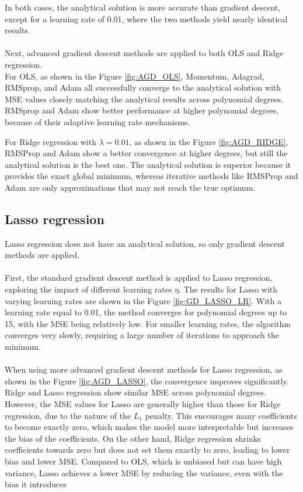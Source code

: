 \documentclass[
 reprint,            %
 amsmath,amssymb,
 aps,
]{revtex4-2}
\begin{document}
In both cases, the analytical solution is more accurate than gradient descent, except for a learning rate of 0.01, where the two methods yield nearly identical results.\\\\
Next, advanced gradient descent methods are applied to both OLS and Ridge regression.\\
For OLS, as shown in the Figure \ref{fig:AGD_OLS}, Momentum, Adagrad, RMSprop, and Adam all successfully converge to the analytical solution with MSE values closely matching the analytical results across polynomial degrees.
RMSprop and Adam show better performance at higher polynomial degrees, because of their adaptive learning rate mechanisms.



For Ridge regression with $\lambda = 0.01$, as shown in the Figure \ref{fig:AGD_RIDGE}, RMSProp and Adam show a better convergence at higher degrees, but still the analytical solution is the best one. 
The analytical solution is superior because it provides the exact global minimum, whereas iterative methods like RMSProp and Adam are only approximations that may not reach the true optimum.



\subsection{Lasso regression}
\label{Lasso regression}
Lasso regression does not have an analytical solution, so only gradient descent methods are applied.\\\\
First, the standard gradient descent method is applied to Lasso regression, exploring the impact of different learning rates $\eta$. 
The results for Lasso with varying learning rates are shown in the Figure \ref{fig:GD_LASSO_LR}.
With a learning rate equal to 0.01, the method converges for polynomial degrees up to 15, with the MSE being relatively low.
For smaller learning rates, the algorithm converges very slowly, requiring a large number of iterations to approach the minimum.\\\\
When using more advanced gradient descent methods for Lasso regression, as shown in the Figure \ref{fig:AGD_LASSO}, the convergence improves significantly.
Ridge and Lasso regression show similar MSE across polynomial degrees.
However, the MSE values for Lasso are generally higher than those for Ridge regression, due to the nature of the $L_1$ penalty. 
This encourages many coefficients to become exactly zero, which makes the model more interpretable but increases the bias of the coefficients.
On the other hand, Ridge regression shrinks coefficients towards zero but does not set them exactly to zero, leading to lower bias and lower MSE.
Compared to OLS, which is unbiased but can have high variance, Lasso achieves a lower MSE by reducing the variance, even with the bias it introduces
\end{document}

